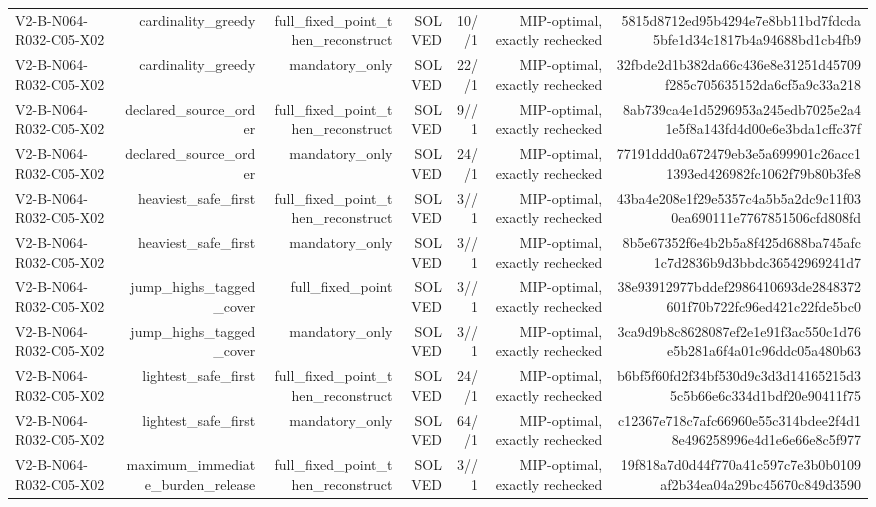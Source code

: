 {\begin{longtable}{lrrrrrr}
V2-B-N064-R032-C05-X02 & cardinality\_greedy & full\_fixed\_point\_then\_reconstruct & SOLVED & 10//1 & MIP-optimal, exactly rechecked & 5815d8712ed95b4294e7e8bb11bd7fdcda5bfe1d34c1817b4a94688bd1cb4fb9 \\
V2-B-N064-R032-C05-X02 & cardinality\_greedy & mandatory\_only & SOLVED & 22//1 & MIP-optimal, exactly rechecked & 32fbde2d1b382da66c436e8e31251d45709f285c705635152da6cf5a9c33a218 \\
V2-B-N064-R032-C05-X02 & declared\_source\_order & full\_fixed\_point\_then\_reconstruct & SOLVED & 9//1 & MIP-optimal, exactly rechecked & 8ab739ca4e1d5296953a245edb7025e2a41e5f8a143fd4d00e6e3bda1cffc37f \\
V2-B-N064-R032-C05-X02 & declared\_source\_order & mandatory\_only & SOLVED & 24//1 & MIP-optimal, exactly rechecked & 77191ddd0a672479eb3e5a699901c26acc11393ed426982fc1062f79b80b3fe8 \\
V2-B-N064-R032-C05-X02 & heaviest\_safe\_first & full\_fixed\_point\_then\_reconstruct & SOLVED & 3//1 & MIP-optimal, exactly rechecked & 43ba4e208e1f29e5357c4a5b5a2dc9c11f030ea690111e7767851506cfd808fd \\
V2-B-N064-R032-C05-X02 & heaviest\_safe\_first & mandatory\_only & SOLVED & 3//1 & MIP-optimal, exactly rechecked & 8b5e67352f6e4b2b5a8f425d688ba745afc1c7d2836b9d3bbdc36542969241d7 \\
V2-B-N064-R032-C05-X02 & jump\_highs\_tagged\_cover & full\_fixed\_point & SOLVED & 3//1 & MIP-optimal, exactly rechecked & 38e93912977bddef2986410693de2848372601f70b722fc96ed421c22fde5bc0 \\
V2-B-N064-R032-C05-X02 & jump\_highs\_tagged\_cover & mandatory\_only & SOLVED & 3//1 & MIP-optimal, exactly rechecked & 3ca9d9b8c8628087ef2e1e91f3ac550c1d76e5b281a6f4a01c96ddc05a480b63 \\
V2-B-N064-R032-C05-X02 & lightest\_safe\_first & full\_fixed\_point\_then\_reconstruct & SOLVED & 24//1 & MIP-optimal, exactly rechecked & b6bf5f60fd2f34bf530d9c3d3d14165215d35c5b66e6c334d1bdf20e90411f75 \\
V2-B-N064-R032-C05-X02 & lightest\_safe\_first & mandatory\_only & SOLVED & 64//1 & MIP-optimal, exactly rechecked & c12367e718c7afc66960e55c314bdee2f4d18e496258996e4d1e6e66e8c5f977 \\
V2-B-N064-R032-C05-X02 & maximum\_immediate\_burden\_release & full\_fixed\_point\_then\_reconstruct & SOLVED & 3//1 & MIP-optimal, exactly rechecked & 19f818a7d0d44f770a41c597c7e3b0b0109af2b34ea04a29bc45670c849d3590 \\

\end{longtable}}
